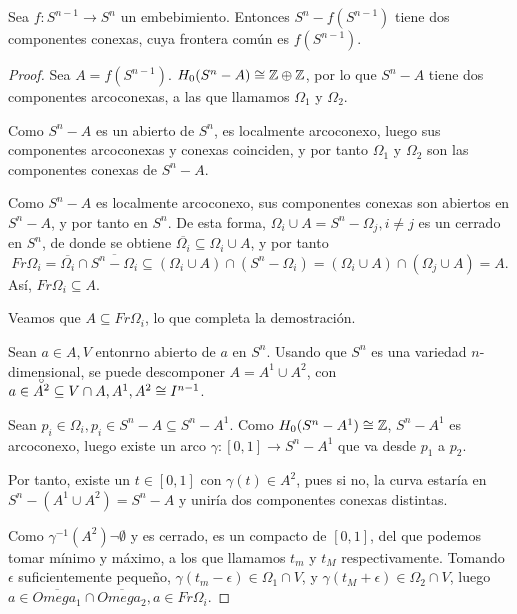 \begin{theorem}
  Sea $f \colon S^{n-1} \to S^n$ un embebimiento. Entonces $S^n - f(S^{n-1})$ tiene dos componentes conexas,
  cuya frontera común es $f(S^{n-1})$.
\end{theorem}

\begin{proof}
  Sea $A = f(S^{n-1})$. $H_0(S^n - A) \cong \mathbb{Z} \oplus \mathbb{Z}$, por lo que $S^n - A$ tiene dos componentes arcoconexas,
  a las que llamamos $\Omega_1$ y $\Omega_2$.

  Como $S^n - A$ es un abierto de $S^n$, es localmente arcoconexo, luego sus componentes arcoconexas y conexas coinciden,
  y por tanto $\Omega_1$ y $\Omega_2$ son las componentes conexas de $S^n - A$.

  Como $S^n - A$ es localmente arcoconexo, sus componentes conexas son abiertos en $S^n -A$, y por tanto en $S^n$.
  De esta forma, $\Omega_i \cup A = S^n - \Omega_j, i \neq j$ es un cerrado en $S^n$, de donde se obtiene
  $\overline{\Omega_i} \subseteq \Omega_i \cup A$, y por tanto
  \[ Fr \Omega_i = \overline{\Omega_i} \cap \overline{S^n - \Omega_i} \subseteq (\Omega_i \cup A) \cap (S^n - \Omega_i) =
  (\Omega_i \cup A) \cap (\Omega_j \cup A) = A. \]
  Así, $Fr \Omega_i \subseteq A$.

  Veamos que $A \subseteq Fr \Omega_i$, lo que completa la demostración.

  Sean $a \in A, V$ entonrno abierto de $a$ en $S^n$. Usando que $S^n$ es una variedad $n$-dimensional, se puede descomponer
  $A = A^1 \cup A^2$, con $a \in \interior{A^2} \subseteq V \cap A, A^1, A^2 \cong I^{n-1}$.

  Sean $p_i \in \Omega_i, p_i \in S^n - A \subseteq S^n - A^1$. Como $H_0(S^n - A^1) \cong \mathbb{Z}$, $S^n - A^1$ es arcoconexo,
  luego existe un arco $\gamma \colon [0,1] \to S^n - A^1$ que va desde $p_1$ a $p_2$.

  Por tanto, existe un $t \in [0,1]$ con $\gamma(t) \in A^2$, pues si no, la curva estaría en $S^n - (A^1 \cup A^2) = S^n - A$
  y uniría dos componentes conexas distintas.

  Como $\gamma^{-1}(A^2) \neg \emptyset$ y es cerrado, es un compacto de $[0,1]$, del que podemos tomar mínimo y máximo,
  a los que llamamos $t_m$ y $t_M$ respectivamente. Tomando $\epsilon$ suficientemente pequeño, $\gamma(t_m - \epsilon) \in \Omega_1 \cap V$,
  y $\gamma(t_M + \epsilon) \in \Omega_2 \cap V$, luego $a \in \overline{Omega_1} \cap \overline{Omega_2}, a \in Fr \Omega_i$.
\end{proof}

